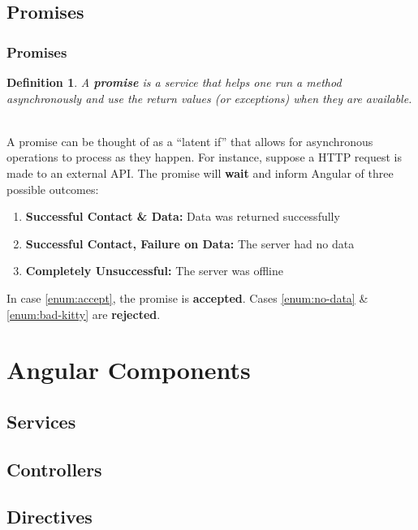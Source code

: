 \documentclass[aspectratio=169]{beamer}
\newtheorem{defn}{Definition}
\begin{document}
\subsection{Promises}
\begin{frame}
\frametitle{Promises}
\begin{defn}
A \textbf{promise} is a service that helps one run a method asynchronously and use the return values (or exceptions) when they are available.
\end{defn}

\mbox{}\\
A promise can be thought of as a ``latent if'' that allows for asynchronous operations to process as they happen. \cite{promise} For instance, suppose a HTTP request is made to an external API. The promise will \textbf{wait} and inform Angular of three possible outcomes:
\begin{enumerate}
	\item \label{enum:accept}\textbf{Successful Contact \& Data:} Data was returned successfully
	\item \label{enum:no-data}\textbf{Successful Contact, Failure on Data:} The server had no data
	\item \label{enum:bad-kitty}\textbf{Completely Unsuccessful:} The server was offline
\end{enumerate}
In case \ref{enum:accept}, the promise is \textbf{accepted}. Cases \ref{enum:no-data} \& \ref{enum:bad-kitty} are \textbf{rejected}.
\end{frame}

\section{Angular Components}
\subsection{Services}
\subsection{Controllers}
\subsection{Directives}
\end{document}
